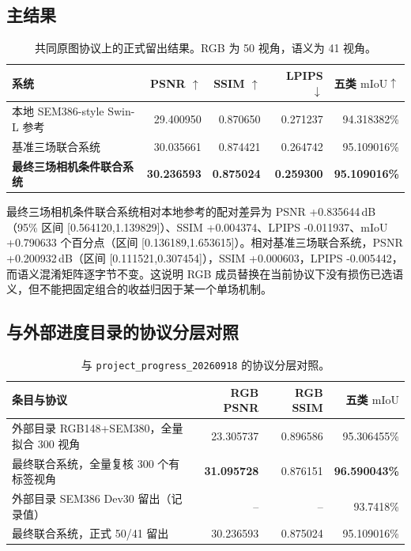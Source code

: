 \documentclass[UTF8,a4paper,11pt]{ctexart}
\newcommand{\mIoU}{\ensuremath{\mathrm{mIoU}}}
\begin{document}
\subsection{主结果}
\begin{table}[t]
\centering
\caption{共同原图协议上的正式留出结果。RGB 为 50 视角，语义为 41 视角。}
\label{tab:main}
\begin{tabular}{lrrrr}
\toprule
系统 & PSNR $\uparrow$ & SSIM $\uparrow$ & LPIPS $\downarrow$ & 五类 $\mIoU\uparrow$\\
\midrule
本地 SEM386-style Swin-L 参考 & 29.400950 & 0.870650 & 0.271237 & 94.318382\%\\
基准三场联合系统 & 30.035661 & 0.874421 & 0.264742 & 95.109016\%\\
\textbf{最终三场相机条件联合系统} & \textbf{30.236593} & \textbf{0.875024} & \textbf{0.259300} & \textbf{95.109016\%}\\
\bottomrule
\end{tabular}
\end{table}

最终三场相机条件联合系统相对本地参考的配对差异为 PSNR +0.835644\,dB（95\% 区间 [0.564120,1.139829]）、SSIM +0.004374、LPIPS -0.011937、\mIoU{} +0.790633 个百分点（区间 [0.136189,1.653615]）。相对基准三场联合系统，PSNR +0.200932\,dB（区间 [0.111521,0.307454]），SSIM +0.000603，LPIPS -0.005442，而语义混淆矩阵逐字节不变。这说明 RGB 成员替换在当前协议下没有损伤已选语义，但不能把固定组合的收益归因于某一个单场机制。

\subsection{与外部进度目录的协议分层对照}
\begin{table}[t]
\centering
\caption{与 \texttt{project\_progress\_20260918} 的协议分层对照。}
\label{tab:peer}
\begin{tabular}{lrrr}
\toprule
条目与协议 & RGB PSNR & RGB SSIM & 五类 $\mIoU$\\
\midrule
外部目录 RGB148+SEM380，全量拟合 300 视角 & 23.305737 & 0.896586 & 95.306455\%\\
最终联合系统，全量复核 300 个有标签视角 & \textbf{31.095728} & 0.876151 & \textbf{96.590043\%}\\
外部目录 SEM386 Dev30 留出（记录值） & -- & -- & 93.7418\%\\
最终联合系统，正式 50/41 留出 & 30.236593 & 0.875024 & 95.109016\%\\
\bottomrule
\end{tabular}
\end{table}
\end{document}
